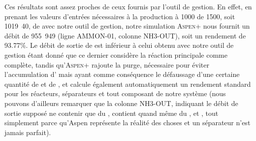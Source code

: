 Ces résultats sont assez proches de ceux fournis par
l'outil de gestion. En effet, en prenant les valeurs
d'entrées nécessaires à la production à \unit{1000}{\kelvin} de
\unit{1500}{\ton\per\dday}, soit \unit{1019.40}{\mole\per\second},
de  avec notre outil de gestion, notre simulation \textsc{Aspen+}
nous fournit un débit de \unit{955.949}{\mole\per\second} (ligne AMMON-01, colonne NH3-OUT),
soit un rendement de 93.77\%. Le débit de sortie de 
est inférieur à celui obtenu avec notre outil de gestion étant donné que
ce dernier considère la réaction principale comme complète, tandis qu'\textsc{Aspen+}
rajoute la purge, nécessaire pour éviter l'accumulation d'
mais ayant comme conséquence le défaussage d'une certaine quantité de
 et de , et calcule également automatiquement un rendement
standard pour les réacteurs, séparateurs et tout composant de notre système
(nous pouvons d'ailleurs remarquer que la colonne NH3-OUT, indiquant le débit
de sortie supposé ne contenir que du , contient quand même du 
,  et , 
tout simplement parce qu'Aspen représente la réalité des choses et 
un séparateur n'est jamais parfait).


